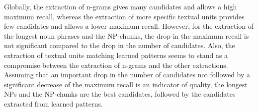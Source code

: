       Globally, the extraction  of n-grams gives many candidates and allows a
      high maximum recall, whereas the extraction of more specific textual units
      provides few candidates and allows a lower maximum recall. However, for
      the extraction of the longest noun phrases and the NP-chunks, the drop in
      the maximum recall is not significant compared to the drop in the number
      of candidates. Also, the extraction of textual units matching learned
      patterns seems to stand as a compromise between the extraction of n-grams
      and the other extractions. Assuming that an important drop in the number
      of candidates not followed by a significant decrease of the maximum recall
      is an indicator of quality, the longest NPs and the NP-chunks are the best
      candidates, followed by the candidates extracted from learned patterns.

